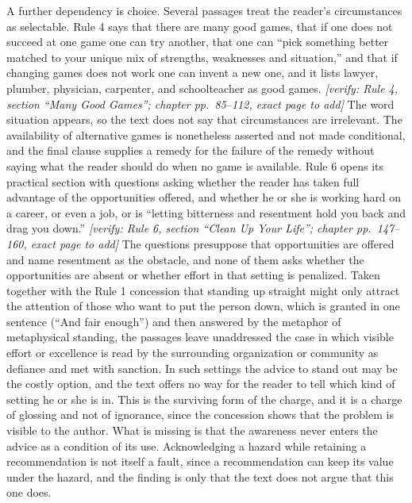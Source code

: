 \documentclass[12pt]{article}
\newif\ifverify\verifytrue
\newcommand{\passage}[1]{\ifverify{\footnotesize\color{gray}\textit{[verify: #1]}}\fi}
\begin{document}
A further dependency is choice. Several passages treat the reader's circumstances as selectable. Rule 4 says that there are many good games, that if one does not succeed at one game one can try another, that one can ``pick something better matched to your unique mix of strengths, weaknesses and situation,'' and that if changing games does not work one can invent a new one, and it lists lawyer, plumber, physician, carpenter, and schoolteacher as good games. \passage{Rule 4, section ``Many Good Games''; chapter pp.~85--112, exact page to add} The word situation appears, so the text does not say that circumstances are irrelevant. The availability of alternative games is nonetheless asserted and not made conditional, and the final clause supplies a remedy for the failure of the remedy without saying what the reader should do when no game is available. Rule 6 opens its practical section with questions asking whether the reader has taken full advantage of the opportunities offered, and whether he or she is working hard on a career, or even a job, or is ``letting bitterness and resentment hold you back and drag you down.'' \passage{Rule 6, section ``Clean Up Your Life''; chapter pp.~147--160, exact page to add} The questions presuppose that opportunities are offered and name resentment as the obstacle, and none of them asks whether the opportunities are absent or whether effort in that setting is penalized. Taken together with the Rule 1 concession that standing up straight might only attract the attention of those who want to put the person down, which is granted in one sentence (``And fair enough'') and then answered by the metaphor of metaphysical standing, the passages leave unaddressed the case in which visible effort or excellence is read by the surrounding organization or community as defiance and met with sanction. In such settings the advice to stand out may be the costly option, and the text offers no way for the reader to tell which kind of setting he or she is in. This is the surviving form of the charge, and it is a charge of glossing and not of ignorance, since the concession shows that the problem is visible to the author. What is missing is that the awareness never enters the advice as a condition of its use. Acknowledging a hazard while retaining a recommendation is not itself a fault, since a recommendation can keep its value under the hazard, and the finding is only that the text does not argue that this one does.
\end{document}
